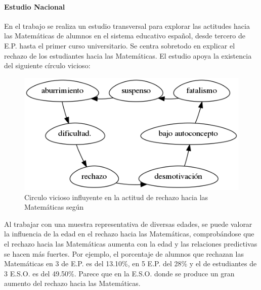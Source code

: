 \paragraph{Estudio Nacional}

En el trabajo \cite{ActitudesHaciaMates} se realiza un estudio transversal para explorar las actitudes hacia las Matemáticas de alumnos en el sistema educativo español, desde tercero de E.P. hasta el primer curso universitario. 
%
Se centra sobretodo en explicar el rechazo de los estudiantes hacia las Matemáticas.
%
El estudio apoya la existencia del siguiente círculo vicioso: 



\begin{figure}[hbt]
\centering
\includegraphics[scale=0.57]{img/circuloVicioso.png}
\caption{Circulo vicioso influyente en la actitud de rechazo hacia las Matemáticas según \cite{ActitudesHaciaMates}}
\label{fig::circuloVicioso}
\end{figure}
\FloatBarrier




Al trabajar con una muestra representativa de diversas edades, se puede valorar la influencia de la edad en el rechazo hacia las Matemáticas, comprobándose que el rechazo hacia las Matemáticas aumenta con la edad y las relaciones predictivas se hacen más fuertes.
%
Por ejemplo, el porcentaje de alumnos que rechazan las Matemáticas en 3 de E.P. es del 13.10\%, en 5 E.P. del 28\%  y el de estudiantes de 3 E.S.O. es del 49.50\%.
%
Parece que en la E.S.O. donde se produce un gran aumento del rechazo hacia las Matemáticas.


